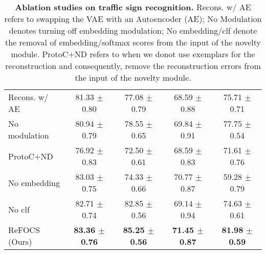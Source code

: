 \begin{table}[ht]
{\begin{tabular}{@{}lcccc@{}}
Recons. w/ AE & 81.33 $\pm$ 0.80             & 77.08 $\pm$ 0.79              & 68.59 $\pm$ 0.88             & 75.71 $\pm$ 0.71              \\
No modulation         & 80.94 $\pm$ 0.79             & 78.55 $\pm$ 0.65              & 69.84 $\pm$ 0.91             & 77.75 $\pm$ 0.54              \\
ProtoC$+$ND     &    76.92 $\pm$ 0.83                         &       72.50 $\pm$ 0.61                     & 68.59 $\pm$ 0.83             & 71.61 $\pm$ 0.76              \\
No embedding     &    83.03 $\pm$ 0.75                         &       74.33 $\pm$ 0.66                     & 70.77 $\pm$ 0.87             & 59.28 $\pm$ 0.79              \\
No clf     &    82.71 $\pm$ 0.74                         &       82.85 $\pm$ 0.56                     & 69.14 $\pm$ 0.94             & 74.63 $\pm$ 0.61              \\
ReFOCS (Ours)                           & \textbf{83.36 $\pm$ 0.76}    & \textbf{85.25 $\pm$ 0.56}     & \textbf{71.45 $\pm$ 0.87}    & \textbf{81.98 $\pm$ 0.59}   \\
\bottomrule
\end{tabular}
}
\caption{\textbf{Ablation studies on traffic sign recognition.} Recons. w/ AE refers to swapping the VAE with an Autoencoder (AE); No Modulation denotes turning off embedding modulation; No embedding/clf denote the removal of embedding/softmax scores from the input of the novelty module. ProtoC$+$ND refers to when we donot use exemplars for the reconstruction and consequently, remove the reconstruction errors from the input of the novelty module.}

\label{tab:ablation_gtsrb_whole}
\end{table}